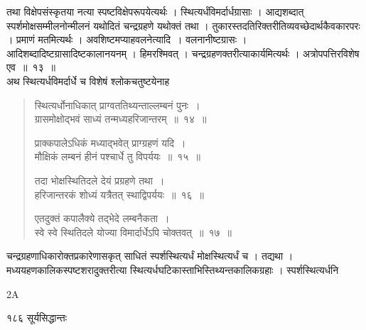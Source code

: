 \documentclass[11pt, openany]{book}
\begin{document}
\begin{sloppypar}
 तथा विक्षेपसंस्कृतया नत्या स्पष्टविक्षेपरूपयेत्यर्थः । स्थित्यर्धंविमर्दार्धग्रासाः । आद्यशब्दात् स्पर्शमोक्षसम्मीलनोन्मीलनं यथोदितं चन्द्रग्रहणे यथोक्तं तथा । तुकारस्तदतिरिक्तरीतिव्यवच्छेदार्थकैवकारपरः । प्रमाणं मतमित्यर्थः । अवशिष्टमप्याह\textendash वलनेत्यादि~। वलनानीष्टग्रासः । आदिशब्दादिष्टग्रासादिष्टकालानयनम् । हिमरश्मिवत् । चन्द्रग्रहणक्तरीत्याकार्यमित्यर्थः । अत्रोपपत्तिरविशेष एव~॥~१३~॥\\
 \noindent अथ स्थित्यर्धविमर्दार्धे च विशेषं श्लोकचतुष्टयेनाह\textendash
\end{sloppypar}


\begin{quote}
  {\ssi स्थित्यर्धोनाधिकात् प्राग्वततिथ्यन्ताल्लम्बनं पुनः~।\\
ग्रासमोक्षोद्भवं साध्यं तन्मध्यहरिजान्तरम्~॥~१४~॥

प्राक्कपालेऽधिकं मध्याद्भवेत् प्राग्ग्रहणं यदि~।\\
मौक्षिकं लम्बनं हीनं पश्चार्धे तु विपर्ययः~॥~१५~॥

तदा भोक्षस्थितिदले देयं प्रग्रहणे तथा~।\\
हरिजान्तरकं शोध्यं यत्रैतत् स्थाद्विपर्ययः~॥~१६~॥

एतदुक्तं कपालैक्ये तद्भेदे लम्बनैकता~।\\
स्वे स्वे स्थितिदले योज्या विमार्दार्धेऽपि चोक्तवत्~॥~१७~॥}
\end{quote}

\begin{sloppypar}
 चन्द्रग्रहणाधिकारोक्तप्रकारेणासकृत् साधितं स्पर्शस्थित्यर्धं मोक्षस्थित्यर्धं च । तद्यथा । मध्ययहणकालिकस्पष्टशरादुक्तरीत्या स्थित्यर्धघटिकास्ताभिस्तिथ्यन्तकालिकग्रहाः । स्पर्शस्थित्यर्धनि\textendash
\end{sloppypar}

{\tiny{2A}}

\newpage



\noindent १८६ \hspace{4cm} सूर्यसिद्धान्तः 
\vspace{1cm}
\end{document}
